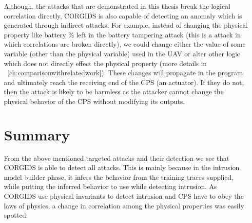 Although, the attacks that are demonstrated in this thesis break the logical correlation directly, \ac{CORGIDS} is also capable of detecting an anomaly which is generated through indirect attacks. For example, instead of changing the physical property like battery \% left in the battery tampering attack (this is a attack in which correlations are broken directly), we could change either the value of some variable (other than the physical variable) used in the \ac{UAV} or alter other logic which does not directly effect the physical property (more details in ~\autoref{ch:comparisonwithrelatedwork}). These changes will propagate in the program and ultimately reach the receiving end of the \ac{CPS} (an actuator). If they do not, then the attack is likely to be harmless as the attacker cannot change the physical behavior of the \ac{CPS} without modifying its outputs. 

\section{Summary}
From the above mentioned targeted attacks and their detection we see that \ac{CORGIDS} is able to detect all attacks. This is mainly because in the intrusion model builder phase, it infers the behavior from the training traces supplied, while putting the inferred behavior to use while detecting intrusion. As \ac{CORGIDS} use physical invariants to detect intrusion and \ac{CPS} have to obey the laws of physics, a change in correlation among the physical properties was easily spotted.


\endinput
=====================================================================
